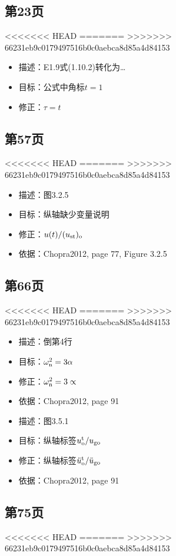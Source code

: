 \documentclass[11pt]{article}
\begin{document}
\subsection*{第23页}
<<<<<<< HEAD
\label{sec:org419ab45}
=======
\label{sec:orgde0ca5c}
>>>>>>> 66231eb9c0179497516b0c0aebca8d85a4d84153

\begin{itemize}
\item 描述：E1.9式(1.10.2)转化为\ldots{}
\item 目标：公式中角标\(t = 1\)
\item 修正：\(\tau = t\)
\end{itemize}

\subsection*{第57页}
<<<<<<< HEAD
\label{sec:org523b2bc}
=======
\label{sec:org4ea04e1}
>>>>>>> 66231eb9c0179497516b0c0aebca8d85a4d84153

\begin{itemize}
\item 描述：图3.2.5
\item 目标：纵轴缺少变量说明
\item 修正：\(u(t) / (u_{\mathrm{st}})_{\mathrm{o}}\)
\item 依据：Chopra2012, page 77, Figure 3.2.5
\end{itemize}

\subsection*{第66页}
<<<<<<< HEAD
\label{sec:org61e35ae}
=======
\label{sec:org7240393}
>>>>>>> 66231eb9c0179497516b0c0aebca8d85a4d84153

\begin{itemize}
\item 描述：倒第4行
\item 目标：\(\omega^{2}_\mathrm{n} = 3 \alpha\)
\item 修正：\(\omega^{2}_\mathrm{n} = 3\propto\)
\item 依据：Chopra2012, page 91

\item 描述：图3.5.1
\item 目标：纵轴标签\({u}^{\mathrm{t}}_\mathrm{o}/u_\mathrm{go}\)
\item 修正：纵轴标签\(\ddot{u}^{\mathrm{t}}_\mathrm{o}/\ddot{u}_\mathrm{go}\)
\item 依据：Chopra2012, page 91
\end{itemize}

\subsection*{第75页}
<<<<<<< HEAD
\label{sec:org2784890}
=======
\label{sec:org6841a34}
>>>>>>> 66231eb9c0179497516b0c0aebca8d85a4d84153
\end{document}
